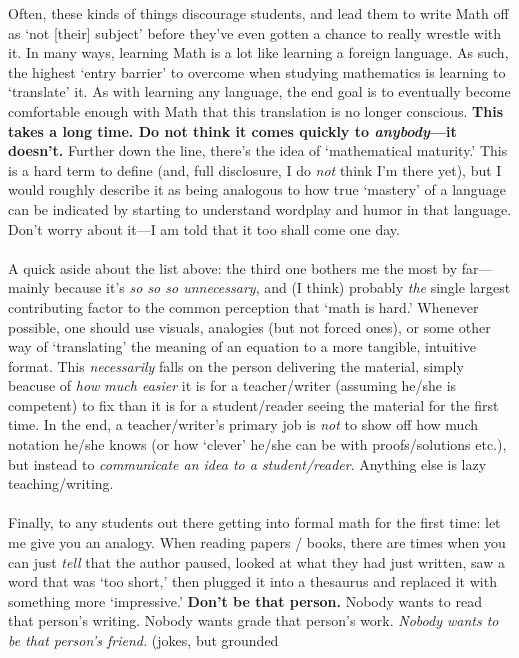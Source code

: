\documentclass[10pt]{article}
\theoremstyle{definition}
\begin{document}
Often, these kinds of things discourage students, and lead them to
write Math off as `not [their] subject' before they've even gotten a
chance to really wrestle with it.  In many ways, learning Math is a
lot like learning a foreign language.  As such, the highest `entry
barrier' to overcome when studying mathematics is learning to
`translate' it.  As with learning any language, the end goal is to
eventually become comfortable enough with Math that this translation
is no longer conscious.  \textbf{This takes a long time.  Do not think
  it comes quickly to \emph{anybody}---it doesn't.}  Further down the
line, there's the idea of `mathematical maturity.'  This is a hard
term to define (and, full disclosure, I do \emph{not} think I'm there
yet), but I would roughly describe it as being analogous to how true
`mastery' of a language can be indicated by starting to understand
wordplay and humor in that language.  Don't worry about it---I am told
that it too shall come one day.\\~\\
A quick aside about the list above: the third one bothers me the most
by far---mainly because it's \emph{so so so unnecessary}, and (I
think) probably \emph{the} single largest contributing factor to the
common perception that `math is hard.'  Whenever possible, one should
use visuals, analogies (but not forced ones), or some other way of
`translating' the meaning of an equation to a more tangible, intuitive
format.  This \emph{necessarily} falls on the person delivering the
material, simply beacuse of \emph{how much easier} it is for a
teacher/writer (assuming he/she is competent) to fix than it is for a
student/reader seeing the material for the first time.  In the end, a
teacher/writer's primary job is \emph{not} to show off how much
notation he/she knows (or how `clever' he/she can be with
proofs/solutions etc.), but instead to \emph{communicate an idea to a
  student/reader}.  Anything else is lazy teaching/writing.  \\~\\
Finally, to any students out there getting into formal math for the
first time: let me give you an analogy.  When reading papers / books,
there are times when you can just \emph{tell} that the author paused,
looked at what they had just written, saw a word that was `too short,'
then plugged it into a thesaurus and replaced it with something more
`impressive.'  \textbf{Don't be that person.}  Nobody wants to read
that person's writing.  Nobody wants grade that person's work.
\emph{Nobody wants to be that person's friend.} (jokes, but grounded
\end{document}

